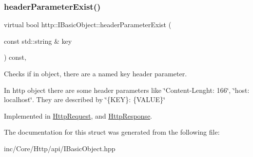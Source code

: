 \subsubsection{\texorpdfstring{header\+Parameter\+Exist()}{headerParameterExist()}}
{\footnotesize\ttfamily virtual bool http\+::\+I\+Basic\+Object\+::header\+Parameter\+Exist (\begin{DoxyParamCaption}\item[{const std\+::string \&}]{key }\end{DoxyParamCaption}) const\hspace{0.3cm}{\ttfamily [pure virtual]}, {\ttfamily [noexcept]}}



Checks if in object, there are a named \textquotesingle{}key\textquotesingle{} header parameter. 

In http object there are some header parameters like \char`\"{}\+Content-\/\+Lenght\+: 166\char`\"{}, \char`\"{}host\+: localhost\char`\"{}. They are described by \char`\"{}\{\+K\+E\+Y\}\+: \{\+V\+A\+L\+U\+E\}\char`\"{} 

Implemented in \hyperlink{classHttpRequest_a74ea75d8685647989346bd5d1d25702a}{Http\+Request}, and \hyperlink{classHttpResponse_ae119bd9c54b39e392b2fd87c3012f53e}{Http\+Response}.



The documentation for this struct was generated from the following file\+:\begin{DoxyCompactItemize}
\item 
inc/\+Core/\+Http/api/I\+Basic\+Object.\+hpp\end{DoxyCompactItemize}
